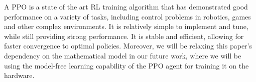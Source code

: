 A PPO \cite{schulman2017proximal} is a state of the art RL training algorithm that has demonstrated good performance on a variety of tasks, including control problems in robotics, games and other complex environments. It is relatively simple to implement and tune, while still providing strong performance. It is stable and efficient, allowing for faster convergence to optimal policies. Moreover, we will be relaxing this paper's dependency on the mathematical model in our future work, where we will be using the model-free learning capability of the PPO agent for training it on the hardware. 


